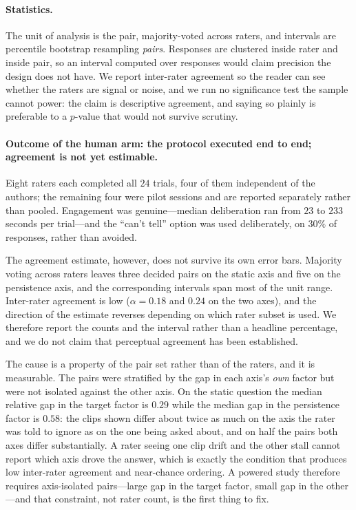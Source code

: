 \documentclass[10pt,twocolumn,letterpaper]{article}
\begin{document}
\paragraph{Statistics.}
The unit of analysis is the pair, majority-voted across raters, and intervals
are percentile bootstrap resampling \emph{pairs}. Responses are clustered inside
rater and inside pair, so an interval computed over responses would claim
precision the design does not have. We report inter-rater agreement so the
reader can see whether the raters are signal or noise, and we run no
significance test the sample cannot power: the claim is descriptive agreement,
and saying so plainly is preferable to a $p$-value that would not survive
scrutiny.



\paragraph{Outcome of the human arm: the protocol executed end to end; agreement is not yet estimable.}
Eight raters each completed all $24$ trials, four of them independent of the
authors; the remaining four were pilot sessions and are reported separately
rather than pooled. Engagement was genuine---median deliberation ran from $23$
to $233$ seconds per trial---and the ``can't tell'' option was used
deliberately, on $30\%$ of responses, rather than avoided.

The agreement estimate, however, does not survive its own error bars. Majority
voting across raters leaves three decided pairs on the static axis and five on
the persistence axis, and the corresponding intervals span most of the unit
range. Inter-rater agreement is low ($\alpha = 0.18$ and $0.24$ on the two
axes), and the direction of the estimate reverses depending on which rater
subset is used. We therefore report the counts and the interval rather than a
headline percentage, and we do not claim that perceptual agreement has been
established.

The cause is a property of the pair set rather than of the raters, and it is
measurable. The pairs were stratified by the gap in each axis's \emph{own}
factor but were not isolated against the other axis. On the static question the
median relative gap in the target factor is $0.29$ while the median gap in the
persistence factor is $0.58$: the clips shown differ about twice as much on the
axis the rater was told to ignore as on the one being asked about, and on half
the pairs both axes differ substantially. A rater seeing one clip drift and the
other stall cannot report which axis drove the answer, which is exactly the
condition that produces low inter-rater agreement and near-chance ordering. A
powered study therefore requires axis-isolated pairs---large gap in the target
factor, small gap in the other---and that constraint, not rater count, is the
first thing to fix.
\end{document}
